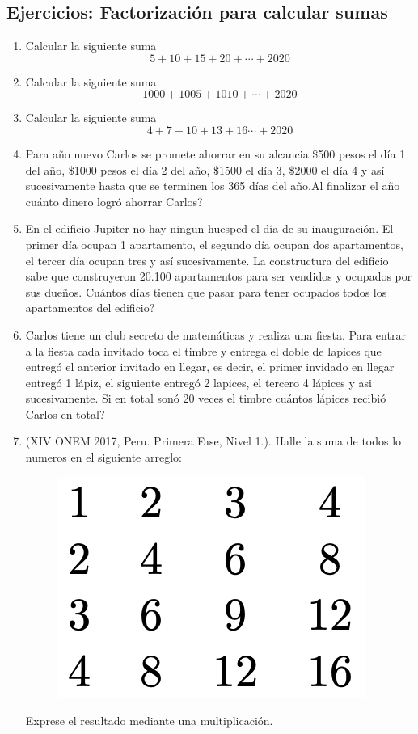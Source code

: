 \begin{center}
	\vspace{-1cm}
	\subsection{ Ejercicios: Factorización para calcular sumas}\label{ejercicios_section_fact_para_calc_sumas}
\end{center}

\begin{enumerate}
	\item Calcular la siguiente suma 
			\[ 5+10+15+20+\cdots+2020\]
			
	\item Calcular la siguiente suma 
			\[ 1000+1005+1010+\cdots+2020\]		
			
	\item Calcular la siguiente suma 
			\[ 4+7+10+13+16\cdots+2020\]		
			
	\item Para año nuevo Carlos se promete ahorrar en su alcancia \$500 pesos el día 1 del año, \$1000 pesos el día 2 del año, \$1500 el día 3, \$2000 el día 4 y así sucesivamente hasta que se terminen los 365 días del año.Al finalizar el año cuánto dinero logró ahorrar Carlos?
	
	\item En el edificio Jupiter no hay ningun huesped el día de su inauguración. El primer día ocupan 1 apartamento, el segundo día ocupan dos apartamentos, el tercer día ocupan tres y así sucesivamente. La constructura del edificio sabe que construyeron 20.100 apartamentos para ser vendidos y ocupados por sus dueños. Cuántos días tienen que pasar para tener ocupados todos los apartamentos del edificio?
	
	\item Carlos tiene un club secreto de matemáticas y realiza una fiesta. Para entrar a la fiesta cada invitado toca el timbre y entrega el doble de lapices que entregó el anterior invitado en llegar, es decir, el primer invidado en llegar entregó 1 lápiz, el siguiente entregó 2 lapices, el tercero 4 lápices y asi sucesivamente. Si en total sonó 20 veces el timbre cuántos lápices recibió Carlos en total? 

	\item (XIV ONEM 2017, Peru. Primera Fase, Nivel 1.). Halle la suma de todos lo numeros en el siguiente arreglo:
	\begin{figure}[h]
		\centering
		\includegraphics[width=0.4\linewidth]{Algebra/imgs/Sumas_problema_Olimp_pERU}
	\end{figure}	
	Exprese el resultado mediante una multiplicación.
\end{enumerate}
\newpage


